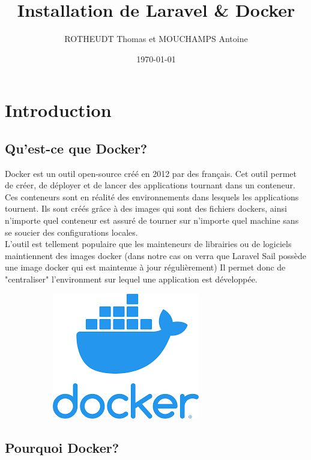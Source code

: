 \documentclass[internal]{nhitec_design}
\author{ROTHEUDT Thomas et MOUCHAMPS Antoine}
\date{\today}
\title{Installation de Laravel \& Docker}
\begin{document}
\maketitle
\newpage
\tableofcontents
\newpage

\section{Introduction}
    \subsection{Qu'est-ce que Docker?}
        
        Docker est un outil open-source créé en 2012 par des français. Cet outil permet de créer, de déployer et de lancer des applications tournant dans un conteneur. Ces conteneurs sont en réalité des environnements dans lesquels les applications tournent.
        Ils sont créés grâce à des images qui sont des fichiers dockers, ainsi n'importe quel conteneur est assuré de tourner sur n'importe quel machine sans se soucier des configurations locales.\\
        L'outil est tellement populaire que les mainteneurs de librairies ou de logiciels maintiennent des images docker (dans notre cas on verra que Laravel Sail possède une image docker qui est maintenue à jour régulièrement)
        Il permet donc de "centraliser" l'environment sur lequel une application est développée. 

        \begin{figure}[h]
            \centering
            \begin{subfigure}[b]{0.3\textwidth}
                \includegraphics[scale=0.4]{Images_formation/LogoDocker.png}
            \end{subfigure}%
        \end{figure}
        
    \subsection{Pourquoi Docker?}
\end{document}
